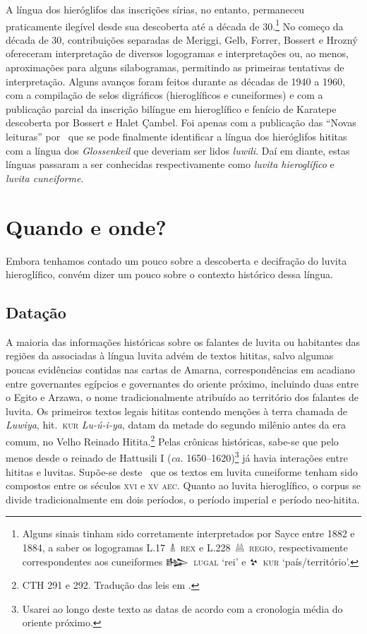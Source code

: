 A língua dos hieróglifos das inscrições sírias, no entanto, permaneceu
praticamente ilegível desde sua descoberta até a década de 30.\footnote{Alguns
	sinais tinham sido corretamente interpretados por Sayce entre 1882 e 1884, a
	saber os logogramas \mbox{L.17 𔐑 \textsc{rex}} e \mbox{L.228 𔔆 \textsc{regio}},
	respectivamente correspondentes aos cuneiformes
	\mbox{\foreignlanguage{hittite}{𒈗} \textsc{lugal}} `rei' e \mbox{\foreignlanguage{hittite}{𒆳} \textsc{kur}}
	`país\slash{}território'.}
No começo da década de 30, contribuições separadas de Meriggi, Gelb, Forrer,
Bossert e Hrozný ofereceram interpretação de diversos logogramas e
interpretações ou, ao menos, aproximações para alguns silabogramas,
permitindo as primeiras tentativas de interpretação.
Alguns avanços foram feitos durante as décadas de 1940 a 1960, com a compilação
de selos digráficos (hieroglíficos e cuneiformes) e com a publicação parcial da
inscrição bilíngue em hieroglífico e fenício de Karatepe descoberta por
Bossert e Halet Çambel.
Foi apenas com a publicação das ``Novas leituras''
por~\textcite{HawkinsMorpurgoNeumann1974} que se pode finalmente identificar a
língua dos hieróglifos hititas com a língua dos
\emph{\foreignlanguage{german}{Glossenkeil}} que deveriam
ser lidos \emph{luwili}.
Daí em diante, estas línguas passaram a ser conhecidas respectivamente como
\emph{luvita hieroglífico} e \emph{luvita cuneiforme}.

\chapter{Quando e onde?}

Embora tenhamos contado um pouco sobre a descoberta e decifração do luvita
hieroglífico, convém dizer um pouco sobre o contexto histórico dessa língua.

\section{Datação}
A maioria das informações históricas sobre os falantes de luvita ou habitantes
das regiões da associadas à língua luvita advém de textos hititas, salvo algumas
poucas evidências contidas nas cartas de Amarna, correspondências em acadiano
entre governantes egípcios e governantes do oriente próximo, incluindo duas
entre o Egito e Arzawa, o nome tradicionalmente atribuído ao território dos
falantes de luvita.
Os primeiros textos legais hititas contendo menções à
terra chamada de \emph{Luwiya}, hit.\ \mbox{\textsc{kur}} \mbox{\textit{Lu-ú-i-ya}},
datam da metade do segundo milênio antes da era comum, no Velho Reinado
Hitita.\footnote{CTH 291 e 292. Tradução das leis em \textcite{Hoffner1997}.}
Pelas crônicas históricas, sabe-se que pelo menos desde o reinado de Hattusili I
(\emph{ca.} 1650--1620)\footnote{Usarei ao longo deste texto as datas de acordo
	com a cronologia média do oriente próximo.} já havia interações entre hititas
e luvitas.
Supõe-se deste~\textcite{Starke1985} que os textos em luvita cuneiforme tenham
sido compostos entre os séculos \textsc{xvi} e \textsc{xv} \textsc{aec}.
Quanto ao luvita hieroglífico, o corpus se divide tradicionalmente em dois
períodos, o período imperial e período neo-hitita.


